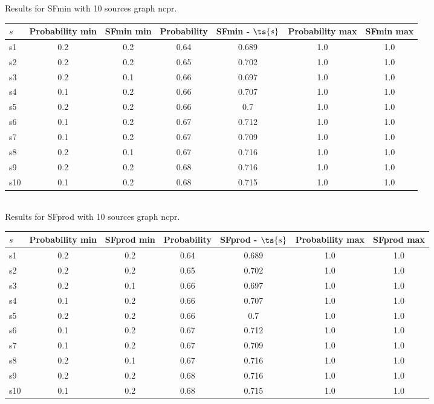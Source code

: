 \documentclass{article}
\begin{document}
\noindent Results for SFmin with 10 sources graph ncpr.

\noindent\begin{tabular}{|l|c|c|c|c|c|c|}
\hline
$s$& Probability min & SFmin min & Probability & SFmin - $\ts{s}$ & Probability max & SFmin max\\
\hline
s1 &0.2 & 0.2 & 0.64 & 0.689 & 1.0 & 1.0\\
\hline
s2 &0.2 & 0.2 & 0.65 & 0.702 & 1.0 & 1.0\\
\hline
s3 &0.2 & 0.1 & 0.66 & 0.697 & 1.0 & 1.0\\
\hline
s4 &0.1 & 0.2 & 0.66 & 0.707 & 1.0 & 1.0\\
\hline
s5 &0.2 & 0.2 & 0.66 & 0.7 & 1.0 & 1.0\\
\hline
s6 &0.1 & 0.2 & 0.67 & 0.712 & 1.0 & 1.0\\
\hline
s7 &0.1 & 0.2 & 0.67 & 0.709 & 1.0 & 1.0\\
\hline
s8 &0.2 & 0.1 & 0.67 & 0.716 & 1.0 & 1.0\\
\hline
s9 &0.2 & 0.2 & 0.68 & 0.716 & 1.0 & 1.0\\
\hline
s10 &0.1 & 0.2 & 0.68 & 0.715 & 1.0 & 1.0\\
\hline
\end{tabular}\\

\noindent Results for SFprod with 10 sources graph ncpr.

\noindent\begin{tabular}{|l|c|c|c|c|c|c|}
\hline
$s$& Probability min & SFprod min & Probability & SFprod - $\ts{s}$ & Probability max & SFprod max\\
\hline
s1 &0.2 & 0.2 & 0.64 & 0.689 & 1.0 & 1.0\\
\hline
s2 &0.2 & 0.2 & 0.65 & 0.702 & 1.0 & 1.0\\
\hline
s3 &0.2 & 0.1 & 0.66 & 0.697 & 1.0 & 1.0\\
\hline
s4 &0.1 & 0.2 & 0.66 & 0.707 & 1.0 & 1.0\\
\hline
s5 &0.2 & 0.2 & 0.66 & 0.7 & 1.0 & 1.0\\
\hline
s6 &0.1 & 0.2 & 0.67 & 0.712 & 1.0 & 1.0\\
\hline
s7 &0.1 & 0.2 & 0.67 & 0.709 & 1.0 & 1.0\\
\hline
s8 &0.2 & 0.1 & 0.67 & 0.716 & 1.0 & 1.0\\
\hline
s9 &0.2 & 0.2 & 0.68 & 0.716 & 1.0 & 1.0\\
\hline
s10 &0.1 & 0.2 & 0.68 & 0.715 & 1.0 & 1.0\\
\hline
\end{tabular}\\
\end{document}
